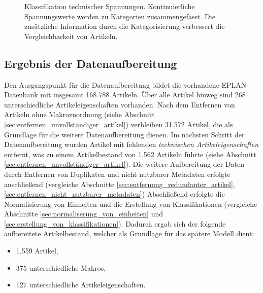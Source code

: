 \begin{figure}[H]
    \caption{Klassifikation technischer Spannungen. Kontinuierliche Spannungswerte werden zu Kategorien zusammengefasst. 
    Die zusätzliche Information durch die Kategorisierung verbessert die Vergleichbarkeit von Artikeln.} 
    \label{fig:spannungsklassifikation} 
\end{figure}


\subsection{Ergebnis der Datenaufbereitung}
\label{sec:ergebnis_der_datenaufbereitung}

Den Ausgangspunkt für die Datenaufbereitung bildet die vorhandene EPLAN-Datenbank mit insgesamt 168.788 Artikeln. Über alle Artikel hinweg sind 268 unterschiedliche Artikeleigenschaften vorhanden. 
Nach dem Entfernen von Artikeln ohne Makrozuordnung (siehe Abschnitt \ref{sec:entfernen_unvollständiger_artikel}) verbleiben 31.572 Artikel, die als Grundlage für die weitere Datenaufbereitung dienen.
Im nächsten Schritt der Datenaufbereitung wurden Artikel mit fehlenden \textit{technischen Artikeleigenschaften} entfernt, was zu einem Artikelbestand von 1.562 Artikeln führte (siehe Abschnitt \ref{sec:entfernen_unvollständiger_artikel}). 
Die weitere Aufbereitung der Daten durch Entfernen von Duplikaten und nicht nutzbarer Metadaten erfolgte anschließend (vergleiche Abschnitte \ref{sec:entfernung_redundanter_artikel}, \ref{sec:entfernen_nicht_nutzbarer_metadaten})
Abschließend erfolgte die Normalisierung von Einheiten und die Erstellung von Klassifikationen (vergleiche Abschnitte \ref{sec:normaliserung_von_einheiten} und \ref{sec:erstellung_von_klassifikationen}).
Dadurch ergab sich der folgende aufbereitete Artikelbestand, welcher als Grundlage für das spätere Modell dient:
 
\begin{itemize} 
    \item 1.559 Artikel, 
    \item 375 unterschiedliche Makros,
    \item 127 unterschiedliche Artikeleigenschaften.
\end{itemize}

